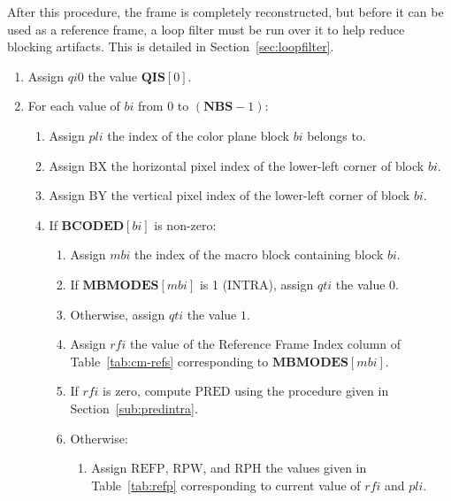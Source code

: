 \documentclass[9pt,letterpaper]{book}
\newcommand{\idx}[1]{{\ensuremath{\mathit{#1}}}}
\newcommand{\qti}{\idx{qti}}
\newcommand{\pli}{\idx{pli}}
\newcommand{\bi}{\idx{bi}}
\newcommand{\mbi}{\idx{mbi}}
\newcommand{\rfi}{\idx{rfi}}
\newcommand{\bitvar}[1]{\ensuremath{\mathbf{\bm{#1}}}}
\newcommand{\locvar}[1]{\ensuremath{\mathrm{#1}}}
\numberwithin{equation}{chapter}
\numberwithin{figure}{chapter}
\numberwithin{table}{chapter}
\begin{document}
After this procedure, the frame is completely reconstructed, but before it can
 be used as a reference frame, a loop filter must be run over it to help reduce
 blocking artifacts.
This is detailed in Section~\ref{sec:loopfilter}.

\begin{enumerate}
\item
Assign \locvar{\idx{qi0}} the value $\bitvar{QIS}[0]$.
\item
For each value of \locvar{\bi} from 0 to $(\bitvar{NBS}-1)$:
\begin{enumerate}
\item
Assign \locvar{\pli} the index of the color plane block \locvar{\bi} belongs
 to.
\item
Assign \locvar{BX} the horizontal pixel index of the lower-left corner of block
 \locvar{\bi}.
\item
Assign \locvar{BY} the vertical pixel index of the lower-left corner of block
 \locvar{\bi}.
\item
If $\bitvar{BCODED}[\locvar{\bi}]$ is non-zero:
\begin{enumerate}
\item
Assign \locvar{\mbi} the index of the macro block containing block
 \locvar{\bi}.
\item
If $\bitvar{MBMODES}[\locvar{\mbi}]$ is 1 (INTRA), assign \locvar{\qti} the
 value $0$.
\item
Otherwise, assign \locvar{\qti} the value $1$.
\item
Assign \locvar{\rfi} the value of the Reference Frame Index column of
 Table~\ref{tab:cm-refs} corresponding to $\bitvar{MBMODES}[\locvar{\mbi}]$.
\item
If \locvar{\rfi} is zero, compute \locvar{PRED} using the procedure given in
 Section~\ref{sub:predintra}.
\item
Otherwise:
\begin{enumerate}
\item
Assign \locvar{REFP}, \locvar{RPW}, and \locvar{RPH} the values given in
 Table~\ref{tab:refp} corresponding to current value of \locvar{\rfi} and
 \locvar{\pli}.


\end{enumerate}
\end{enumerate}
\end{enumerate}
\end{enumerate}
\end{document}
